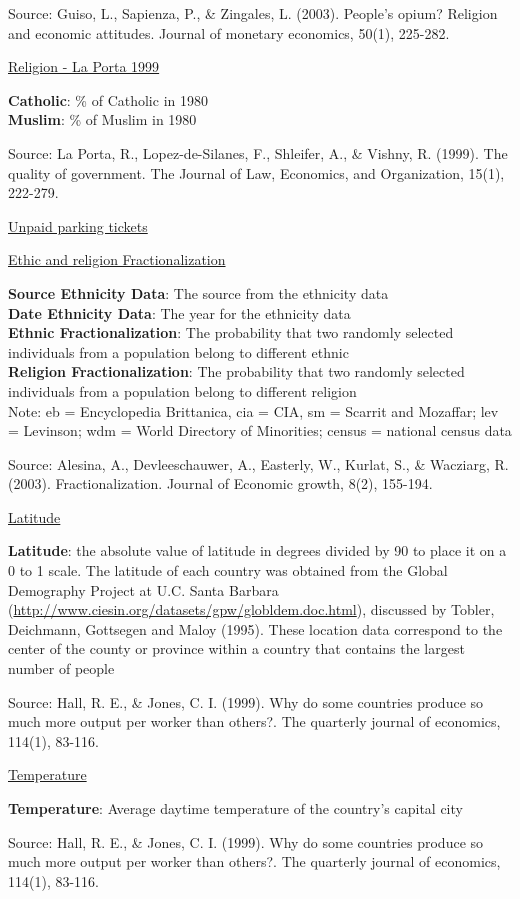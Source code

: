 \documentclass[]{article}
\begin{document}
Source: Guiso, L., Sapienza, P., \& Zingales, L. (2003). People's opium?
Religion and economic attitudes. Journal of monetary economics, 50(1),
225-282.

\protect\hyperlink{Religion2}{Religion - La Porta 1999}

\textbf{Catholic}: \% of Catholic in 1980\\
\textbf{Muslim}: \% of Muslim in 1980

Source: La Porta, R., Lopez-de-Silanes, F., Shleifer, A., \& Vishny, R.
(1999). The quality of government. The Journal of Law, Economics, and
Organization, 15(1), 222-279.

\protect\hyperlink{ticket}{Unpaid parking tickets}

\protect\hyperlink{fractionalization}{Ethic and religion
Fractionalization}

\textbf{Source Ethnicity Data}: The source from the ethnicity data\\
\textbf{Date Ethnicity Data}: The year for the ethnicity data\\
\textbf{Ethnic Fractionalization}: The probability that two randomly
selected individuals from a population belong to different ethnic\\
\textbf{Religion Fractionalization}: The probability that two randomly
selected individuals from a population belong to different religion\\
Note: eb = Encyclopedia Brittanica, cia = CIA, sm = Scarrit and
Mozaffar; lev = Levinson; wdm = World Directory of Minorities; census =
national census data

Source: Alesina, A., Devleeschauwer, A., Easterly, W., Kurlat, S., \&
Wacziarg, R. (2003). Fractionalization. Journal of Economic growth,
8(2), 155-194.

\protect\hyperlink{latitude}{Latitude}

\textbf{Latitude}: the absolute value of latitude in degrees divided by
90 to place it on a 0 to 1 scale. The latitude of each country was
obtained from the Global Demography Project at U.C. Santa Barbara
(\url{http://www.ciesin.org/datasets/gpw/globldem.doc.html}), discussed
by Tobler, Deichmann, Gottsegen and Maloy (1995). These location data
correspond to the center of the county or province within a country that
contains the largest number of people

Source: Hall, R. E., \& Jones, C. I. (1999). Why do some countries
produce so much more output per worker than others?. The quarterly
journal of economics, 114(1), 83-116.

\protect\hyperlink{Temperature}{Temperature}

\textbf{Temperature}: Average daytime temperature of the country's
capital city

Source: Hall, R. E., \& Jones, C. I. (1999). Why do some countries
produce so much more output per worker than others?. The quarterly
journal of economics, 114(1), 83-116.
\end{document}
